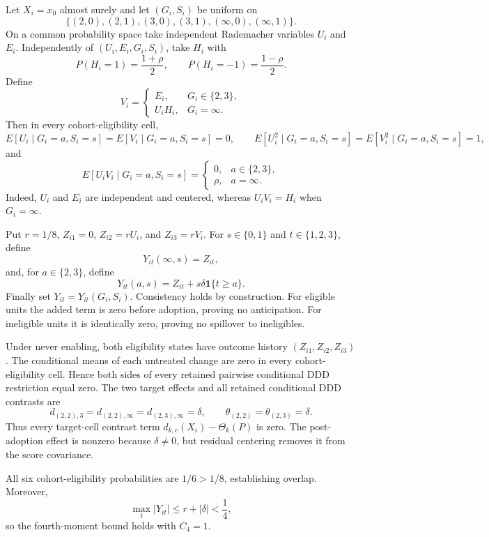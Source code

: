Let \(X_i=x_0\) almost surely and let \((G_i,S_i)\) be uniform on
\[
 \{(2,0),(2,1),(3,0),(3,1),(\infty,0),(\infty,1)\}.
\]
On a common probability space take independent Rademacher variables \(U_i\) and \(E_i\).  Independently of \((U_i,E_i,G_i,S_i)\), take \(H_i\) with
\[
 P(H_i=1)=\frac{1+\rho}{2},
 \qquad
 P(H_i=-1)=\frac{1-\rho}{2}.
\]
Define
\[
 V_i=
 \begin{cases}
 E_i,&G_i\in\{2,3\},\\
 U_iH_i,&G_i=\infty.
 \end{cases}
\]
Then in every cohort-eligibility cell,
\[
 E[U_i\mid G_i=a,S_i=s]=E[V_i\mid G_i=a,S_i=s]=0,
 \qquad
 E[U_i^2\mid G_i=a,S_i=s]=E[V_i^2\mid G_i=a,S_i=s]=1,
\]
and
\[
 E[U_iV_i\mid G_i=a,S_i=s]
 =\begin{cases}
 0,&a\in\{2,3\},\\
 \rho,&a=\infty.
 \end{cases}
\]
Indeed, \(U_i\) and \(E_i\) are independent and centered, whereas \(U_iV_i=H_i\) when \(G_i=\infty\).

Put \(r=1/8\), \(Z_{i1}=0\), \(Z_{i2}=rU_i\), and \(Z_{i3}=rV_i\).  For \(s\in\{0,1\}\) and \(t\in\{1,2,3\}\), define
\[
 Y_{it}(\infty,s)=Z_{it},
\]
and, for \(a\in\{2,3\}\), define
\[
 Y_{it}(a,s)=Z_{it}+s\delta\mathbf 1\{t\ge a\}.
\]
Finally set \(Y_{it}=Y_{it}(G_i,S_i)\).  Consistency holds by construction.  For eligible units the added term is zero before adoption, proving no anticipation.  For ineligible units it is identically zero, proving no spillover to ineligibles.

Under never enabling, both eligibility states have outcome history \((Z_{i1},Z_{i2},Z_{i3})\).  The conditional means of each untreated change are zero in every cohort-eligibility cell.  Hence both sides of every retained pairwise conditional DDD restriction equal zero.  The two target effects and all retained conditional DDD contrasts are
\[
 d_{(2,2),3}=d_{(2,2),\infty}
 =d_{(2,3),\infty}=\delta,
 \qquad
 \theta_{(2,2)}=\theta_{(2,3)}=\delta.
\]
Thus every target-cell contrast term \(d_{k,c}(X_i)-\Theta_k(P)\) is zero.  The post-adoption effect is nonzero because \(\delta\ne0\), but residual centering removes it from the score covariance.

All six cohort-eligibility probabilities are \(1/6>1/8\), establishing overlap.  Moreover,
\[
 \max_t|Y_{it}|\le r+|\delta|<\frac14,
\]
so the fourth-moment bound holds with \(C_4=1\).

